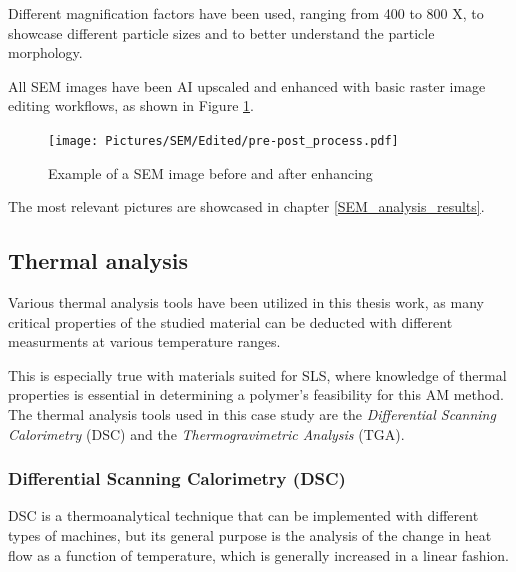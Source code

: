 \documentclass[a4paper]{article}
\begin{document}
            Different magnification factors have been used, ranging from 400 to 800 X, to showcase different particle sizes and to better understand 
            the particle morphology. 

            \clearpage

            All SEM images have been AI upscaled and enhanced with basic raster image editing workflows, as shown in Figure \ref{fig:SEM_edited_vs_unedited}. \\ 

                \begin{figure}[ht]
                    \centering
                    \texttt{[image: Pictures/SEM/Edited/pre-post\_process.pdf]}
                    \caption{Example of a SEM image before and after enhancing}
                    \label{fig:SEM_edited_vs_unedited}
                \end{figure}

            The most relevant pictures are showcased in chapter \ref{SEM_analysis_results}. \\

            \clearpage

            \subsection{Thermal analysis\label{Thermal_analysis}}
    
            Various thermal analysis tools have been utilized in this thesis work, as many critical properties of the studied material 
            can be deducted with different measurments at various temperature ranges. 

            This is especially true with materials suited for SLS, where knowledge of thermal properties is 
            essential in determining a polymer's feasibility for this AM method. 
            The thermal analysis tools used in this case study are the \textit{Differential Scanning Calorimetry} (DSC) and the
            \textit{Thermogravimetric Analysis} (TGA). \\

            \subsubsection{Differential Scanning Calorimetry (DSC)\label{DSC_analysis}}
        
            DSC is a thermoanalytical technique that can be implemented with different types of machines, 
            but its general purpose is the analysis of the change in heat flow as a function of temperature, which is generally increased in 
            a linear fashion. 
        
\end{document}
